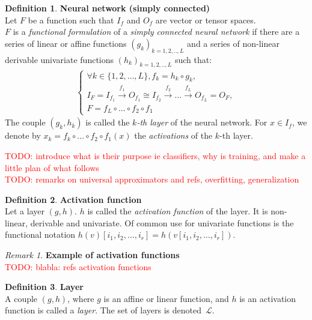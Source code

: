 \documentclass{article}
\theoremstyle{definition}
\newtheorem{definition}{Definition}[section]
\theoremstyle{remark}
\newtheorem{remark}{Remark}[section]
\theoremstyle{plain}
\newcommand{\lf}{\mathcal{L}}
\newcommand{\ovec}{}
\newcommand{\todo}[1]{\textcolor{red}{TODO: #1\\}}
\begin{document}
\begin{definition}\textbf{Neural network (simply connected)}\\
Let $F$ be a function such that $I_f$ and $O_f$ are vector or tensor spaces.\\
$F$ is a \emph{functional formulation} of a \emph{simply connected neural network} if there are a series of linear or affine functions $(g_k)_{k=1,2,..,L}$ and a series of non-linear derivable univariate functions $(h_k)_{k=1,2,..,L}$ such that:
\begin{gather*}
\left\{
  \begin{array}{l}
    \forall k \in \{1, 2, \ldots, L\}, f_k = h_k \circ g_k, \\
    I_F = I_{f_1} \xrightarrow{f_1} O_{f_1} \cong I_{f_2} \xrightarrow{f_2} \dots \xrightarrow{f_L} O_{f_L} = O_F, \\
    F = f_{L} \circ ... \circ f_{2} \circ f_1
  \end{array}
\right.
\end{gather*}
The couple $(g_k, h_k)$ is called the \emph{$k$-th layer} of the neural network.
For $\ovec{x} \in I_f$, we denote by $\ovec{x_k} = f_k \circ ... \circ f_{2} \circ f_1 (\ovec{x})$ the \emph{activations} of the $k$-th layer.
\label{def:nn}
\end{definition}

\todo{introduce what is their purpose ie classifiers, why is training, and make a little plan of what follows}
\todo{remarks on universal approximators and refs, overfitting, generalization}

\begin{definition}\textbf{Activation function}\\
Let a layer $(g,h)$. $h$ is called the \emph{activation function} of the layer. It is non-linear, derivable and univariate. Of common use for univariate functions is the functional notation $h(v)[i_1, i_2, \ldots, i_r] = h(v[i_1, i_2, \ldots, i_r])$.
\end{definition}

\begin{remark}\textbf{Example of activation functions}\\
\todo{blabla: refs activation functions}
\end{remark}

\begin{definition}\textbf{Layer}\\
A couple $(g,h)$, where $g$ is an affine or linear function, and $h$ is an activation function is called a \emph{layer}. The set of layers is denoted~$\lf$.
\end{definition}
\end{document}
